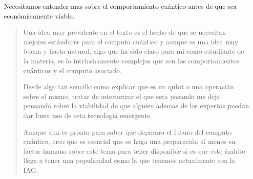 \textcolor{bibi}{Necesitamos entender mas sobre el comportamiento cuántico antes de que sea económicamente viable.}
\begin{quote}
	Una idea muy prevalente en el texto es el hecho de que se necesitan mejores estándares para el computo cuántico y aunque es una idea muy buena y hasta natural, algo que ha sido claro para mi como estudiante de la materia, es lo intrínsicamente complejos que son los comportamientos cuánticos y el computo asociado. \vspace{.3cm}

	Desde algo tan sencillo como explicar que es un qubit o una operacián sobre el mismo, tratar de interiorizar el que esta pasando me deja pensando sobre la viabilidad de que alguien ademas de los expertos puedan dar buen uso de esta tecnología emergente. \vspace{.3cm}

	Aunque aun es pronto para saber que deparara el futuro del computo cuántico, creo que es esencial que se haga una preparación al menos en factor humano sobre este tema para tener disponible si es que este ámbito llega a tener una popularidad como la que tenemos actualmente con la IAG.
\end{quote}
